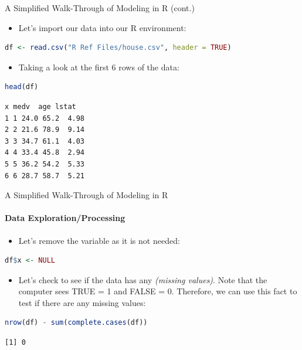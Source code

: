 \begin{frame}[fragile]{A Simplified Walk-Through of Modeling in R (cont.)}
\begin{itemize}
  \item Let’s import our data into our R environment:
\end{itemize}
\begin{lstlisting}[language=R]
df <- read.csv("R Ref Files/house.csv", header = TRUE)
\end{lstlisting}
\begin{itemize}
  \item Taking a look at the first 6 rows of the data:
\end{itemize}
\begin{lstlisting}[language=R]
head(df)
\end{lstlisting}
\begin{lstlisting}[style=output]
  x medv  age lstat
1 1 24.0 65.2  4.98
2 2 21.6 78.9  9.14
3 3 34.7 61.1  4.03
4 4 33.4 45.8  2.94
5 5 36.2 54.2  5.33
6 6 28.7 58.7  5.21
\end{lstlisting}
\end{frame}

\begin{frame}[fragile]{A Simplified Walk-Through of Modeling in R}
\framesubtitle{Data Exploration/Processing}
\begin{itemize}
  \item Let’s remove the variable  as it is not needed:
\end{itemize}
\begin{lstlisting}[language=R]
df$x <- NULL
\end{lstlisting}
\begin{itemize}
  \item Let’s check to see if the data has any  \textit{(missing values)}. Note that the computer sees TRUE = 1 and FALSE = 0. Therefore, we can use this fact to test if there are any missing values:
\end{itemize}
\begin{lstlisting}[language=R]
nrow(df) - sum(complete.cases(df))
\end{lstlisting}
\begin{lstlisting}[style=output]
[1] 0
\end{lstlisting}
\end{frame}

